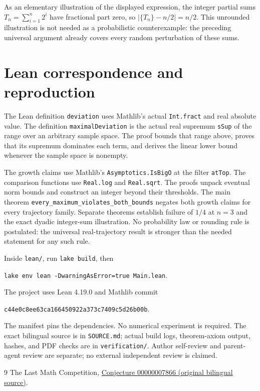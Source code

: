 \documentclass[11pt]{article}
\begin{document}
As an elementary illustration of the displayed expression, the integer partial sums $T_n=\sum_{i=1}^n2^i$ have fractional part zero, so $|\{T_n\}-n/2|=n/2$. This unrounded illustration is not needed as a probabilistic counterexample: the preceding universal argument already covers every random perturbation of these sums.

\section*{Lean correspondence and reproduction}
The Lean definition \texttt{deviation} uses Mathlib's actual \texttt{Int.fract} and real absolute value. The definition \texttt{maximalDeviation} is the actual real supremum \texttt{sSup} of the range over an arbitrary sample space. The proof bounds that range above, proves that its supremum dominates each term, and derives the linear lower bound whenever the sample space is nonempty.

The growth claims use Mathlib's \texttt{Asymptotics.IsBigO} at the filter \texttt{atTop}. The comparison functions use \texttt{Real.log} and \texttt{Real.sqrt}. The proofs unpack eventual norm bounds and construct an integer beyond their thresholds. The main theorem \texttt{every\_maximum\_violates\_both\_bounds} negates both growth claims for every trajectory family. Separate theorems establish failure of $1/4$ at $n=3$ and the exact dyadic integer-sum illustration. No probability law or rounding rule is postulated: the universal real-trajectory result is stronger than the needed statement for any such rule.

Inside \texttt{lean/}, run \texttt{lake build}, then
\begin{center}\texttt{lake env lean -DwarningAsError=true Main.lean}.\end{center}
The project uses Lean 4.19.0 and Mathlib commit
\begin{center}\small\texttt{c44e0c8ee63ca166450922a373c7409c5d26b00b}.\end{center}
The manifest pins the dependencies. No numerical experiment is required. The exact bilingual source is in \texttt{SOURCE.md}; actual build logs, theorem-axiom output, hashes, and PDF checks are in \texttt{verification/}. Author self-review and parent-agent review are separate; no external independent review is claimed.

\begin{thebibliography}{9}
 The Last Math Competition,
\href{https://github.com/The-Last-Math-Competition/The-Last-Math-Competition/blob/main/conjectures/00000007866.md}{Conjecture 00000007866 (original bilingual source)}.
\end{thebibliography}
\end{document}
